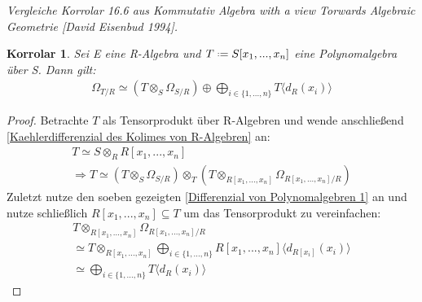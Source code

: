 \documentclass[10pt,a4paper]{report}
\newcommand{\ModulsOfDifferenzials}{Kommutativ Algebra with a view Torwards Algebraic Geometrie [David Eisenbud 1994]}
\newcounter{Aussage}[chapter]
\newtheorem{korrolar}[Aussage]{Korrolar}
\newcommand{\divR}[2]{\Omega_{#1/#2}}
\newcommand{\divf}[1]{d_{#1}}
\newcommand{\Tensor}[3]{#1 \otimes_{#2} #3}
\newcommand*{\defeq}{\mathrel{\vcenter{\baselineskip0.5ex \lineskiplimit0pt
                     \hbox{\scriptsize.}\hbox{\scriptsize.}}}%
                     =}
\begin{document}
\textit{Vergleiche Korrolar 16.6 aus \ModulsOfDifferenzials.}
\begin{korrolar}\label{Differenzial von Polynomalgebren 2}
Sei E eine R-Algebra und $T \defeq S[x_1,...,x_n]$ eine Polynomalgebra über S. Dann gilt:
\begin{gather*}
\divR{T}{R} \simeq (\Tensor{T}{S}{\divR{S}{R}}) \oplus \bigoplus_{i \in \lbrace 1,...,n \rbrace} T \langle \divf{R}(x_i) \rangle
\end{gather*}
\end{korrolar}
\begin{proof}
Betrachte $T$ als Tensorprodukt über R-Algebren und wende anschließend \cref{Kaehlerdifferenzial des Kolimes von R-Algebren} an:
\begin{gather*}
T \simeq \Tensor{S}{R}{R[x_1,...,x_n]} \\
\Rightarrow T \simeq \Tensor{(\Tensor{T}{S}{\divR{S}{R}})}{T}{(\Tensor{T}{R[x_1,...,x_n]}{\divR{R[x_1,...,x_n]}{R}})}
\end{gather*}
Zuletzt nutze den soeben gezeigten \cref{Differenzial von Polynomalgebren 1} an und nutze schließlich $R[x_1,...,x_n] \subseteq T$ um das Tensorprodukt zu vereinfachen:
\begin{gather*}
\Tensor{T}{R[x_1,...,x_n]}{\divR{R[x_1,...,x_n]}{R}}\\
\simeq \Tensor{T}{R[x_1,...,x_n]}{\bigoplus_{i \in \lbrace 1,...,n \rbrace} R[x_1,...,x_n]\langle \divf{R[x_i]}(x_i) \rangle } \\
\simeq \bigoplus_{i \in \lbrace 1,...,n \rbrace} T \langle \divf{R}(x_i) \rangle
\end{gather*}
\end{proof}
\end{document}
